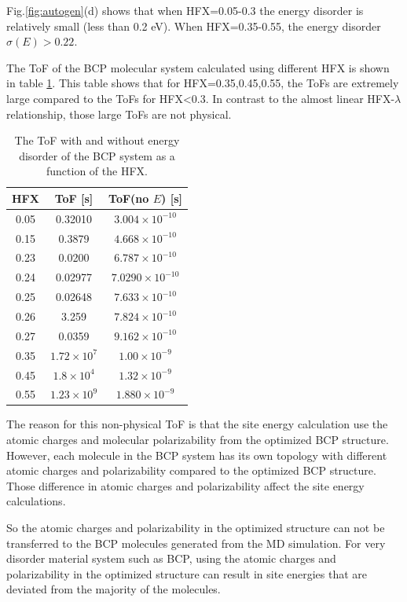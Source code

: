 \documentclass[letterpaper,12pt]{article}
\begin{document}
Fig.\ref{fig:autogen}(d) shows that when HFX=0.05-0.3 the energy disorder is relatively small (less than 0.2 eV). When HFX=0.35-0.55, the energy disorder $\sigma(E)>0.22$. 

The ToF of the BCP molecular system calculated using different HFX is shown in table \ref{tab:ToF_BCP_HFX}. This table shows that for HFX=0.35,0.45,0.55, the ToFs are extremely large compared to the ToFs for HFX<0.3. 
In contrast to the almost linear HFX-$\lambda$ relationship, those large ToFs are not physical. 


\begin{table}[H]
    \centering
    \begin{tabular}{c c c }
    \hline
        HFX & ToF [s] & ToF(no $E$) [s] \\
    \hline
        0.05 &  0.32010 & $3.004 \times 10^{-10}$ \\
        0.15 & 0.3879 & $4.668 \times 10^{-10}$ \\
        0.23 & 0.0200 & $6.787 \times 10^{-10} $ \\
        0.24 & 0.02977 & $7.0290 \times 10^{-10} $ \\
        0.25 & 0.02648 & $7.633 \times 10^{-10}$ \\
        0.26 & 3.259 & $7.824 \times 10^{-10}$ \\
        0.27 & 0.0359 &  $9.162 \times 10^{-10}$ \\
        0.35 & $1.72 \times 10^7 $ & $1.00 \times 10^{-9}$ \\
        0.45 & $1.8 \times 10^4$ & $1.32\times 10^{-9}$ \\
        0.55 & $1.23 \times 10^9 $ & $1.880 \times 10^{-9} $ \\
    \hline
    \end{tabular}
    \caption{The ToF with and without energy disorder of the BCP system as a function of the HFX. }
    \label{tab:ToF_BCP_HFX}
\end{table}


The reason for this non-physical ToF is that the site energy calculation use the atomic charges and molecular polarizability from the optimized BCP structure. However, each molecule in the BCP system has its own topology with different atomic charges and polarizability compared to the optimized BCP structure.  
Those difference in atomic charges and polarizability affect the site energy calculations. 

So the atomic charges and polarizability in the optimized structure can not be transferred to the BCP molecules generated from the MD simulation. 
For very disorder material system such as BCP, using the atomic charges and polarizability in the optimized structure can result in site energies that are deviated from the majority of the molecules. 
\end{document}
